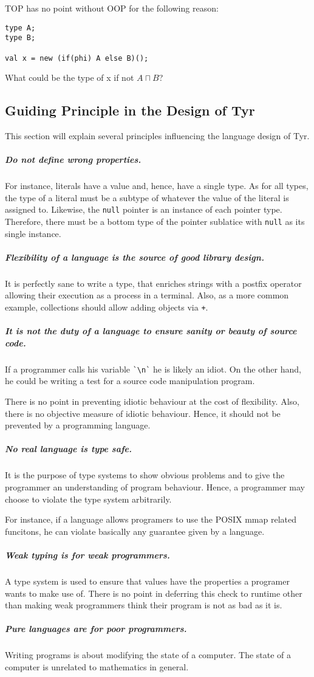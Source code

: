 TOP has no point without OOP for the following reason:

\begin{lstlisting}
type A;
type B;

val x = new (if(phi) A else B)();
\end{lstlisting}

What could be the type of x if not $A \sqcap B$?


\subsection{Guiding Principle in the Design of Tyr}

This section will explain several principles influencing the language design of Tyr.

\subparagraph{Do not define wrong properties.}

For instance, literals have a value and, hence, have a single type.
As for all types, the type of a literal must be a subtype of whatever the value of the literal is assigned to.
Likewise, the \texttt{null} pointer is an instance of each pointer type.
Therefore, there must be a bottom type of the pointer sublatice with \texttt{null} as its single instance.

\subparagraph{Flexibility of a language is the source of good library design.}

It is perfectly sane to write a type, that enriches strings with a postfix operator allowing their execution as a process in a terminal.
Also, as a more common example, collections should allow adding objects via \texttt{+}.


\subparagraph{It is not the duty of a language to ensure sanity or beauty of source code.}

If a programmer calls his variable \verb|`\n`| he is likely an idiot.
On the other hand, he could be writing a test for a source code manipulation program.

There is no point in preventing idiotic behaviour at the cost of flexibility.
Also, there is no objective measure of idiotic behaviour.
Hence, it should not be prevented by a programming language.


\subparagraph{No real language is type safe.}

It is the purpose of type systems to show obvious problems and to give the programmer an understanding of program behaviour.
Hence, a programmer may choose to violate the type system arbitrarily.

For instance, if a language allows programers to use the POSIX mmap related funcitons, he can violate basically any guarantee given by a language.


\subparagraph{Weak typing is for weak programmers.}

A type system is used to ensure that values have the properties a programer wants to make use of.
There is no point in deferring this check to runtime other than making weak programmers think their program is not as bad as it is.


\subparagraph{Pure languages are for poor programmers.}

Writing programs is about modifying the state of a computer.
The state of a computer is unrelated to mathematics in general.